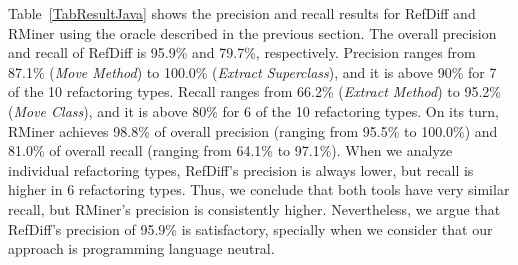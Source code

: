 Table~\ref{TabResultJava} shows the precision and recall results for RefDiff and RMiner using the oracle described in the previous section. The overall precision and recall of RefDiff is 95.9\% and 79.7\%, respectively.
Precision ranges from 87.1\% (\emph{Move Method}) to 100.0\% (\emph{Extract Superclass}), and it is above 90\% for 7 of the 10 refactoring types.
Recall ranges from 66.2\% (\emph{Extract Method}) to 95.2\% (\emph{Move Class}), and it is above 80\% for 6 of the 10 refactoring types.
On its turn, RMiner achieves 98.8\% of overall precision (ranging from 95.5\% to 100.0\%) and 81.0\% of overall recall (ranging from 64.1\% to 97.1\%).
When we analyze individual refactoring types, RefDiff's precision is always lower, but recall is higher in 6 refactoring types.
Thus, we conclude that both tools have very similar recall, but RMiner's precision is consistently higher.
Nevertheless, we argue that RefDiff's precision of 95.9\% is satisfactory, specially when we consider that our approach is programming language neutral.




